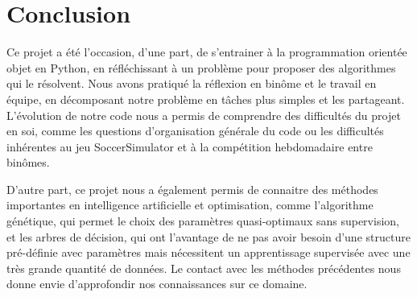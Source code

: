 \documentclass[a4paper,12pt]{article}
\begin{document}
\section{Conclusion}

Ce projet a été l'occasion, d'une part, de s'entrainer à la programmation orientée objet en Python, en réfléchissant à un problème pour proposer des algorithmes qui le résolvent. Nous avons pratiqué la réflexion en binôme et le travail en équipe, en décomposant notre problème en tâches plus simples et les partageant. L'évolution de notre code nous a permis de comprendre des difficultés du projet en soi, comme les questions d'organisation générale du code ou les difficultés inhérentes au jeu SoccerSimulator et à la compétition hebdomadaire entre binômes.

D'autre part, ce projet nous a également permis de connaitre des méthodes importantes en intelligence artificielle et optimisation, comme l'algorithme génétique, qui permet le choix des paramètres quasi-optimaux sans supervision, et les arbres de décision, qui ont l'avantage de ne pas avoir besoin d'une structure pré-définie avec paramètres mais nécessitent un apprentissage supervisée avec une très grande quantité de données. Le contact avec les méthodes précédentes nous donne envie d'approfondir nos connaissances sur ce domaine.
\end{document}
